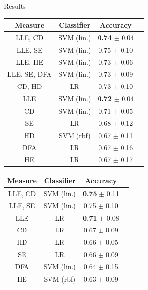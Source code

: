 \documentclass{beamer}
\begin{document}
\begin{frame}{Results}

\begin{table}[tbp]
\scriptsize
  \parbox{0.495\linewidth}{
\centering
\begin{tabular}{|c|c|c|c|}
\hline
\textbf{Measure} & \textbf{Classifier} & \textbf{Accuracy} \\ \hline
LLE, CD & SVM (lin.) & \textbf{0.74} $\pm$ 0.04 \\ \hline 
LLE, SE & SVM (lin.) & 0.75 $\pm$ 0.10 \\ \hline 
LLE, HE & SVM (lin.) & 0.73 $\pm$ 0.06 \\ \hline 
LLE, SE, DFA & SVM (lin.) & 0.73 $\pm$ 0.09 \\ \hline 
CD, HD & LR & 0.73 $\pm$ 0.10 \\ \hhline{=|=|=|=}
LLE & SVM (lin.) & \textbf{0.72} $\pm$ 0.04 \\ \hline
CD & SVM (lin.) & 0.71 $\pm$ 0.05 \\ \hline 
SE & LR & 0.68 $\pm$ 0.12 \\ \hline
HD & SVM (rbf) & 0.67 $\pm$ 0.11 \\ \hline
DFA & LR & 0.67 $\pm$ 0.16 \\ \hline
HE & LR & 0.67 $\pm$ 0.17 \\ \hline
\end{tabular}
}
\hfill
  \parbox{0.495\linewidth}{
\centering
\begin{tabular}{|c|c|c|c|}
\hline
\textbf{Measure} & \textbf{Classifier} & \textbf{Accuracy} \\ \hline
LLE, CD & SVM (lin.) & \textbf{0.75} $\pm$ 0.11 \\ \hline 
LLE, SE & SVM (lin.) & 0.75 $\pm$ 0.10 \\ \hhline{=|=|=|=}
LLE & LR & \textbf{0.71}  $\pm$ 0.08 \\ \hline 
CD & LR & 0.67 $\pm$ 0.09 \\ \hline
HD & LR & 0.66 $\pm$ 0.05 \\ \hline
SE & LR & 0.66 $\pm$ 0.09 \\ \hline
DFA & SVM (lin.) & 0.64 $\pm$ 0.15 \\ \hline
HE & SVM (rbf) & 0.63 $\pm$ 0.09 \\ \hline
\end{tabular}
}
\end{table}
\end{frame}

\end{document}

